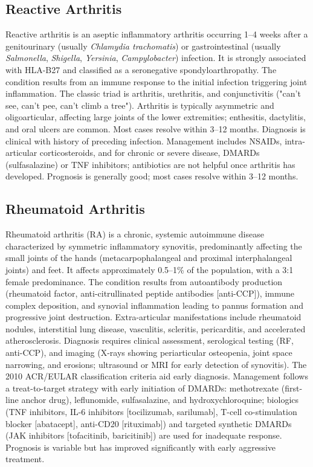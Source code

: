 \subsection{Reactive Arthritis}
\label{sec:Reactive Arthritis}
Reactive arthritis is an aseptic inflammatory arthritis occurring 1--4 weeks after a genitourinary (usually \textit{Chlamydia trachomatis}) or gastrointestinal (usually \textit{Salmonella}, \textit{Shigella}, \textit{Yersinia}, \textit{Campylobacter}) infection. It is strongly associated with HLA-B27 and classified as a seronegative spondyloarthropathy. The condition results from an immune response to the initial infection triggering joint inflammation. The classic triad is arthritis, urethritis, and conjunctivitis ("can't see, can't pee, can't climb a tree"). Arthritis is typically asymmetric and oligoarticular, affecting large joints of the lower extremities; enthesitis, dactylitis, and oral ulcers are common. Most cases resolve within 3--12 months. Diagnosis is clinical with history of preceding infection. Management includes NSAIDs, intra-articular corticosteroids, and for chronic or severe disease, DMARDs (sulfasalazine) or TNF inhibitors; antibiotics are not helpful once arthritis has developed. Prognosis is generally good; most cases resolve within 3--12 months.

\subsection{Rheumatoid Arthritis}
\label{sec:Rheumatoid Arthritis}
Rheumatoid arthritis (RA) is a chronic, systemic autoimmune disease characterized by symmetric inflammatory synovitis, predominantly affecting the small joints of the hands (metacarpophalangeal and proximal interphalangeal joints) and feet. It affects approximately 0.5--1\% of the population, with a 3:1 female predominance. The condition results from autoantibody production (rheumatoid factor, anti-citrullinated peptide antibodies [anti-CCP]), immune complex deposition, and synovial inflammation leading to pannus formation and progressive joint destruction. Extra-articular manifestations include rheumatoid nodules, interstitial lung disease, vasculitis, scleritis, pericarditis, and accelerated atherosclerosis. Diagnosis requires clinical assessment, serological testing (RF, anti-CCP), and imaging (X-rays showing periarticular osteopenia, joint space narrowing, and erosions; ultrasound or MRI for early detection of synovitis). The 2010 ACR/EULAR classification criteria aid early diagnosis. Management follows a treat-to-target strategy with early initiation of DMARDs: methotrexate (first-line anchor drug), leflunomide, sulfasalazine, and hydroxychloroquine; biologics (TNF inhibitors, IL-6 inhibitors [tocilizumab, sarilumab], T-cell co-stimulation blocker [abatacept], anti-CD20 [rituximab]) and targeted synthetic DMARDs (JAK inhibitors [tofacitinib, baricitinib]) are used for inadequate response. Prognosis is variable but has improved significantly with early aggressive treatment.

